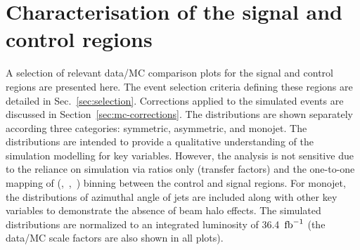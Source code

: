 \section{Characterisation of the signal and control regions}
\label{sec:yields}

A selection of relevant data/MC comparison plots for the signal and
control regions are presented here.  The event selection criteria
defining these regions are detailed in
Sec.~\ref{sec:selection}. Corrections applied to the simulated events
are discussed in Section~\ref{sec:mc-corrections}. The
distributions are shown separately according three \njet categories:
symmetric, asymmetric, and monojet. The distributions are intended to
provide a qualitative understanding of the simulation modelling for
key variables. However, the analysis is not sensitive due to the
reliance on simulation via ratios only (\ie transfer factors) and the
one-to-one mapping of (\njet,~\nb,~\scalht) binning between the
control and signal regions. For monojet, the distributions of
azimuthal angle of jets are included along with other key variables to
demonstrate the absence of beam halo effects. The simulated
distributions are normalized to an integrated luminosity of
36.4~$\text{fb}^{-1}$ (the data/MC scale factors are also shown in all plots).


%
%
%
%

